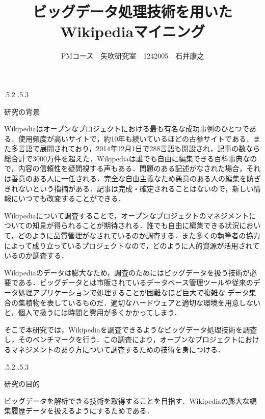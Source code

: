 \documentclass[uplatex]{jsarticle}
\title{\vspace{-14mm}ビッグデータ処理技術を用いたWikipediaマイニング}
\author{PMコース　矢吹研究室　1242005　石井康之}
\date{}%
\makeatletter
\renewcommand{\section}{%
    \if@slide\clearpage\fi
    \@startsection{section}{1}{\z@}%
    {\Cvs \@plus.5\Cdp \@minus.2\Cdp}%
    {.5\Cvs \@plus.3\Cdp}%
    {\normalfont\raggedright}}
\makeatother
\begin{document}
\maketitle





\section{研究の背景}

Wikipediaはオープンなプロジェクトにおける最も有名な成功事例のひとつである\cite{ウィキレボ}．使用頻度が高いサイトで，約10年も続いているほどの古参サイトである．また多言語で展開されており，2014年12月1日で288言語も開設され，記事の数なら総合計で3000万件を超えた\cite{統計wiki}．Wikipediaは誰でも自由に編集できる百科事典なので，内容の信頼性を疑問視する声もある．問題のある記述がなされた場合，それは善意のある人に一任される．完全な自由主義なため悪意のある人の編集を防ぎきれないという指摘がある．記事は完成・確定されることはないので，新しい情報にいつでも改変することができる．

Wikipediaについて調査することで，オープンなプロジェクトのマネジメントについての知見が得られることが期待される．誰でも自由に編集できる状況において，どのように品質管理がなされているのか調査する．また多くの執筆者の協力によって成り立っているプロジェクトなので，どのように人的資源が活用されているのか調査する．

Wikipediaのデータは膨大なため，調査のためにはビッグデータを扱う技術が必要である．ビッグデータとは市販されているデータベース管理ツールや従来のデータ処理アプリケーションで処理することが困難なほど巨大で複雑な データ集合の集積物を表しているものだ\cite{ビッグデータwiki}．適切なハードウェアと適切な環境を用意しないと，個人で扱うには時間と費用が多くかかってしまう．

そこで本研究では，Wikipediaを調査できるようなビッグデータ処理技術を調査し，そのベンチマークを行う．この調査により，オープンなプロジェクトにおけるマネジメントのあり方について調査するための技術を身につける．





\section{研究の目的}

ビッグデータを解析できる技術を取得することを目指す．Wikipediaの膨大な編集履歴データを扱えるようにするためである．
\end{document}
